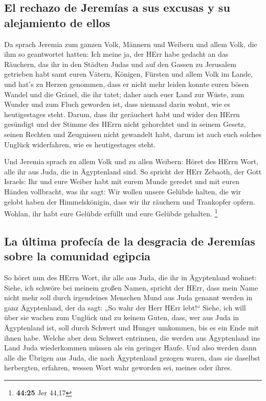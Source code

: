 \hypertarget{el-rechazo-de-jeremuxedas-a-sus-excusas-y-su-alejamiento-de-ellos}{%
\subsection{El rechazo de Jeremías a sus excusas y su alejamiento de
ellos}\label{el-rechazo-de-jeremuxedas-a-sus-excusas-y-su-alejamiento-de-ellos}}

 Da sprach Jeremia zum ganzen Volk, Männern und Weibern
und allem Volk, die ihm so geantwortet hatten:  Ich meine
ja, der HErr habe gedacht an das Räuchern, das ihr in den Städten Judas
und auf den Gassen zu Jerusalem getrieben habt samt euren Vätern,
Königen, Fürsten und allem Volk im Lande, und hat's zu Herzen genommen,
 dass er nicht mehr leiden konnte euren bösen Wandel und
die Gräuel, die ihr tatet; daher auch euer Land zur Wüste, zum Wunder
und zum Fluch geworden ist, dass niemand darin wohnt, wie es
heutigestages steht.  Darum, dass ihr geräuchert habt und
wider den HErrn gesündigt und der Stimme des HErrn nicht gehorchtet und
in seinem Gesetz, seinen Rechten und Zeugnissen nicht gewandelt habt,
darum ist auch euch solches Unglück widerfahren, wie es heutigestages
steht.

 Und Jeremia sprach zu allem Volk und zu allen Weibern:
Höret des HErrn Wort, alle ihr aus Juda, die in Ägyptenland sind.
 So spricht der HErr Zebaoth, der Gott Israels: Ihr und
eure Weiber habt mit eurem Munde geredet und mit euren Händen
vollbracht, was ihr sagt: Wir wollen unsere Gelübde halten, die wir
gelobt haben der Himmelskönigin, dass wir ihr räuchern und Trankopfer
opfern. Wohlan, ihr habt eure Gelübde erfüllt und eure Gelübde gehalten.
\footnote{\textbf{44:25} Jer 44,17}

\hypertarget{la-uxfaltima-profecuxeda-de-la-desgracia-de-jeremuxedas-sobre-la-comunidad-egipcia}{%
\subsection{La última profecía de la desgracia de Jeremías sobre la
comunidad
egipcia}\label{la-uxfaltima-profecuxeda-de-la-desgracia-de-jeremuxedas-sobre-la-comunidad-egipcia}}

 So höret nun des HErrn Wort, ihr alle aus Juda, die ihr
in Ägyptenland wohnet: Siehe, ich schwöre bei meinem großen Namen,
spricht der HErr, dass mein Name nicht mehr soll durch irgendeines
Menschen Mund aus Juda genannt werden in ganz Ägyptenland, der da sagt:
„So wahr der Herr HErr lebt!{}``  Siehe, ich will über
sie wachen zum Unglück und zu keinem Guten, dass, wer aus Juda in
Ägyptenland ist, soll durch Schwert und Hunger umkommen, bis es ein Ende
mit ihnen habe.  Welche aber dem Schwert entrinnen, die
werden aus Ägyptenland ins Land Juda wiederkommen müssen als ein
geringer Haufe. Und also werden dann alle die Übrigen aus Juda, die nach
Ägyptenland gezogen waren, dass sie daselbst herbergten, erfahren,
wessen Wort wahr geworden sei, meines oder ihres.


